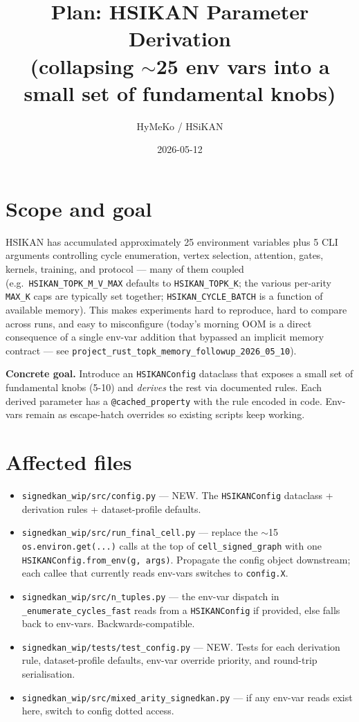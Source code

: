 \documentclass[11pt,a4paper]{article}
\title{Plan: HSIKAN Parameter Derivation\\
       (collapsing $\sim$25 env vars into a small set of fundamental knobs)}
\author{HyMeKo / HSiKAN}
\date{2026-05-12}
\begin{document}
\maketitle

\section{Scope and goal}
HSIKAN has accumulated approximately 25 environment variables plus 5
CLI arguments controlling cycle enumeration, vertex selection,
attention, gates, kernels, training, and protocol --- many of them
coupled (e.g.\ \texttt{HSIKAN\_TOPK\_M\_V\_MAX} defaults to
\texttt{HSIKAN\_TOPK\_K}; the various per-arity \texttt{MAX\_K} caps
are typically set together; \texttt{HSIKAN\_CYCLE\_BATCH} is a function
of available memory).  This makes experiments hard to reproduce, hard
to compare across runs, and easy to misconfigure (today's morning OOM
is a direct consequence of a single env-var addition that bypassed an
implicit memory contract --- see
\texttt{project\_rust\_topk\_memory\_followup\_2026\_05\_10}).

\textbf{Concrete goal.}  Introduce an \texttt{HSIKANConfig} dataclass
that exposes a small set of fundamental knobs (5-10) and \emph{derives}
the rest via documented rules.  Each derived parameter has a
\texttt{@cached\_property} with the rule encoded in code.  Env-vars
remain as escape-hatch overrides so existing scripts keep working.

\section{Affected files}
\begin{itemize}
\item \texttt{signedkan\_wip/src/config.py} --- NEW.  The
  \texttt{HSIKANConfig} dataclass + derivation rules +
  dataset-profile defaults.
\item \texttt{signedkan\_wip/src/run\_final\_cell.py} --- replace the
  $\sim$15 \texttt{os.environ.get(...)} calls at the top of
  \texttt{cell\_signed\_graph} with one \texttt{HSIKANConfig.from\_env(g, args)}.
  Propagate the config object downstream; each callee that currently
  reads env-vars switches to \texttt{config.X}.
\item \texttt{signedkan\_wip/src/n\_tuples.py} --- the env-var
  dispatch in \texttt{\_enumerate\_cycles\_fast} reads from a
  \texttt{HSIKANConfig} if provided, else falls back to env-vars.
  Backwards-compatible.
\item \texttt{signedkan\_wip/tests/test\_config.py} --- NEW.  Tests
  for each derivation rule, dataset-profile defaults, env-var
  override priority, and round-trip serialisation.
\item \texttt{signedkan\_wip/src/mixed\_arity\_signedkan.py} ---
  if any env-var reads exist here, switch to config dotted access.
\end{itemize}
\end{document}
